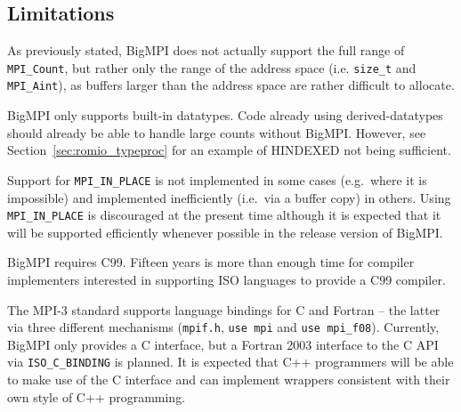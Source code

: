 
\subsection{Limitations}

As previously stated, BigMPI does not actually support the full
range of \texttt{MPI\_Count}, but rather only the range of the
address space (i.e. \texttt{size\_t} and \texttt{MPI\_Aint}), as buffers
larger than the address space are rather difficult to allocate.

BigMPI only supports built-in datatypes.  
Code already using derived-datatypes should already be able 
to handle large counts without BigMPI\@.
However, see Section~\ref{sec:romio_typeproc} 
for an example of HINDEXED not being sufficient.

Support for \texttt{MPI\_IN\_PLACE} is not 
implemented in some cases (e.g.\ where it is impossible) and 
implemented inefficiently (i.e.\ via a buffer copy) in others.
Using \texttt{MPI\_IN\_PLACE} is discouraged at the present time
although it is expected that it will be supported efficiently whenever
possible in the release version of BigMPI.

BigMPI requires C99.  Fifteen years is more than enough time for compiler 
implementers interested in supporting ISO languages to provide a C99
compiler.

The MPI-3 standard supports language bindings for C and Fortran --
the latter via three different mechanisms
(\texttt{mpif.h}, \texttt{use mpi} and \texttt{use mpi\_f08}).
Currently, BigMPI only provides a C interface, but a Fortran 2003
interface to the C API via \texttt{ISO\_C\_BINDING} is planned.
It is expected that C++ programmers will be able to make use of the
C interface and can implement wrappers consistent with their own
style of C++ programming.
